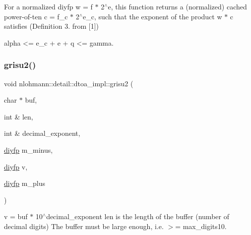 For a normalized diyfp w = f $\ast$ 2$^\wedge$e, this function returns a (normalized) cached power-\/of-\/ten c = f\+\_\+c $\ast$ 2$^\wedge$e\+\_\+c, such that the exponent of the product w $\ast$ c satisfies (Definition 3. from \mbox{[}1\mbox{]}) \begin{DoxyVerb} alpha <= e_c + e + q <= gamma.\end{DoxyVerb}
 \mbox{\label{namespacenlohmann_1_1detail_1_1dtoa__impl_a05b681dcb8569b9784c6dccfadb01633}} 
\subsubsection{\texorpdfstring{grisu2()}{grisu2()}\hspace{0.1cm}{\footnotesize\ttfamily [1/2]}}
{\footnotesize\ttfamily void nlohmann\+::detail\+::dtoa\+\_\+impl\+::grisu2 (\begin{DoxyParamCaption}\item[{char $\ast$}]{buf,  }\item[{int \&}]{len,  }\item[{int \&}]{decimal\+\_\+exponent,  }\item[{\hyperlink{structnlohmann_1_1detail_1_1dtoa__impl_1_1diyfp}{diyfp}}]{m\+\_\+minus,  }\item[{\hyperlink{structnlohmann_1_1detail_1_1dtoa__impl_1_1diyfp}{diyfp}}]{v,  }\item[{\hyperlink{structnlohmann_1_1detail_1_1dtoa__impl_1_1diyfp}{diyfp}}]{m\+\_\+plus }\end{DoxyParamCaption})\hspace{0.3cm}{\ttfamily [inline]}}

v = buf $\ast$ 10$^\wedge$decimal\+\_\+exponent len is the length of the buffer (number of decimal digits) The buffer must be large enough, i.\+e. $>$= max\+\_\+digits10. \mbox{\label{namespacenlohmann_1_1detail_1_1dtoa__impl_aab7a9670a4f4704a5d0347ad7588576b}} 
